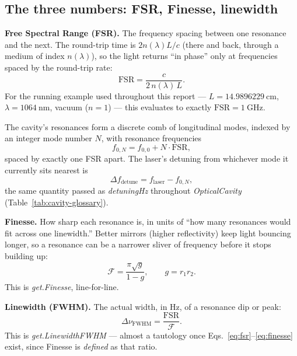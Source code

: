 \documentclass[9pt]{article}
\begin{document}
\subsection{The three numbers: FSR, Finesse, linewidth}
\label{sec:cavity-three-numbers}
\textbf{Free Spectral Range (FSR).} The frequency spacing between one
resonance and the next. The round-trip time is $2n(\lambda)L/c$ (there and
back, through a medium of index $n(\lambda)$), so the light returns ``in phase'' only
at frequencies spaced by the round-trip rate:
\begin{equation}
\mathrm{FSR} = \frac{c}{2\, n(\lambda)\, L}.
\label{eq:fsr}
\end{equation}
For the running example used throughout this report --- $L=\SI{14.9896229}{\centi\meter}$,
$\lambda = \SI{1064}{\nano\meter}$, vacuum ($n=1$) --- this evaluates to exactly $\mathrm{FSR}=\SI{1}{\giga\hertz}$.

The cavity's resonances form a discrete comb of longitudinal modes, indexed
by an integer mode number $N$, with resonance frequencies
\begin{equation}
f_{0,N} = f_{0,0} + N \cdot \mathrm{FSR},
\label{eq:mode-comb}
\end{equation}
spaced by exactly one FSR apart. The laser's detuning from whichever mode it
currently sits nearest is
\begin{equation}
\Delta f_{\mathrm{detune}} = f_{\mathrm{laser}} - f_{0,N},
\label{eq:detuning-def}
\end{equation}
the same quantity passed as \textit{detuningHz} throughout \textit{OpticalCavity}
(Table~\ref{tab:cavity-glossary}).

\textbf{Finesse.} How sharp each resonance is, in units of ``how many
resonances would fit across one linewidth.'' Better mirrors (higher
reflectivity) keep light bouncing longer, so a resonance can be a narrower
sliver of frequency before it stops building up:
\begin{equation}
\mathcal{F} = \frac{\pi\sqrt{g}}{1-g}, \qquad g = r_1 r_2.
\label{eq:finesse}
\end{equation}
This is \textit{get.Finesse}, line-for-line.

\textbf{Linewidth (FWHM).} The actual width, in \si{\hertz}, of a resonance
dip or peak:
\begin{equation}
\Delta\nu_{\mathrm{FWHM}} = \frac{\mathrm{FSR}}{\mathcal{F}}.
\label{eq:linewidth}
\end{equation}
This is \textit{get.LinewidthFWHM} --- almost a tautology once
Eqs.~\eqref{eq:fsr}--\eqref{eq:finesse} exist, since Finesse is \emph{defined}
as that ratio.
\end{document}
